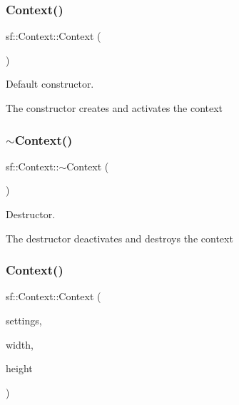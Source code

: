 \subsubsection{\texorpdfstring{Context()}{Context()}\hspace{0.1cm}{\footnotesize\ttfamily [1/2]}}
{\footnotesize\ttfamily sf\+::\+Context\+::\+Context (\begin{DoxyParamCaption}{ }\end{DoxyParamCaption})}



Default constructor. 

The constructor creates and activates the context \begin{DoxyVerb}\end{DoxyVerb}
 \mbox{\label{classsf_1_1_context_a805b1bbdb3e52b1fda7c9bf2cd6ca86b}} 
\subsubsection{\texorpdfstring{$\sim$Context()}{~Context()}}
{\footnotesize\ttfamily sf\+::\+Context\+::$\sim$\+Context (\begin{DoxyParamCaption}{ }\end{DoxyParamCaption})}



Destructor. 

The destructor deactivates and destroys the context \begin{DoxyVerb}\end{DoxyVerb}
 \mbox{\label{classsf_1_1_context_a2a9e3529e48919120e6b6fc10bad296c}} 
\subsubsection{\texorpdfstring{Context()}{Context()}\hspace{0.1cm}{\footnotesize\ttfamily [2/2]}}
{\footnotesize\ttfamily sf\+::\+Context\+::\+Context (\begin{DoxyParamCaption}\item[{const \mbox{\hyperlink{structsf_1_1_context_settings}{Context\+Settings}} \&}]{settings,  }\item[{unsigned int}]{width,  }\item[{unsigned int}]{height }\end{DoxyParamCaption})}



